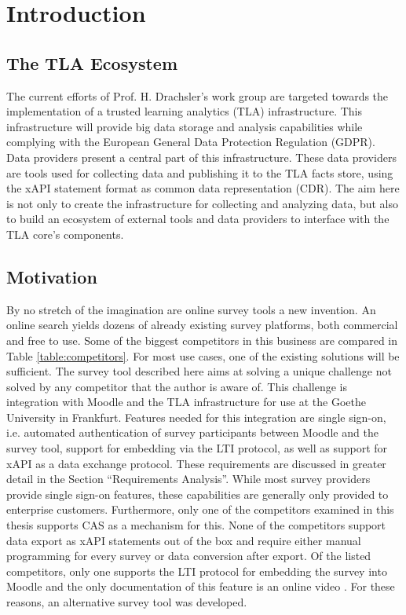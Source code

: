 \section{Introduction}


\subsection{The TLA Ecosystem}
    The current efforts of Prof. H. Drachsler's work group are targeted towards the implementation
    of a trusted learning analytics (TLA) infrastructure. This infrastructure will
    provide big data storage and analysis capabilities while complying with the European General
    Data Protection Regulation (GDPR). Data providers present a central part of this infrastructure.
    These data providers are tools used for collecting data and publishing it to
    the TLA facts store, using the xAPI statement format as common data representation (CDR).
    The aim here is not only to create the infrastructure for collecting and analyzing data,
    but also to build an ecosystem of external tools and data providers
    to interface with the TLA core's components.

\subsection{Motivation}
    By no stretch of the imagination are online survey tools a new invention.
    An online search yields dozens of already existing survey platforms, both
    commercial and free to use. Some of the biggest competitors in this business
    are compared in Table \ref{table:competitors}. For most use cases, one
    of the existing solutions will be sufficient. The survey tool described here
    aims at solving a unique challenge not solved by any competitor that the author
    is aware of. This challenge is integration with Moodle and the TLA
    infrastructure for use at the Goethe University in Frankfurt.
    Features needed for this integration are single sign-on, i.e.
    automated authentication of survey participants between Moodle and
    the survey tool, support for embedding via the LTI protocol, 
    as well as support for xAPI as a data exchange protocol.
    These requirements are discussed in greater detail in the Section
    ``Requirements Analysis''. While most survey providers provide single
    sign-on features, these capabilities are generally only provided to enterprise
    customers. Furthermore, only one of the competitors examined in this thesis
    supports CAS as a mechanism for this. None of the competitors
    support data export as xAPI statements out of the box and require either
    manual programming for every survey or data conversion after export. 
    Of the listed competitors, only one supports the LTI protocol for
    embedding the survey into Moodle and the only documentation of this 
    feature is an online video \cite{qualtrics-lti-video}. For these
    reasons, an alternative survey tool was developed.

